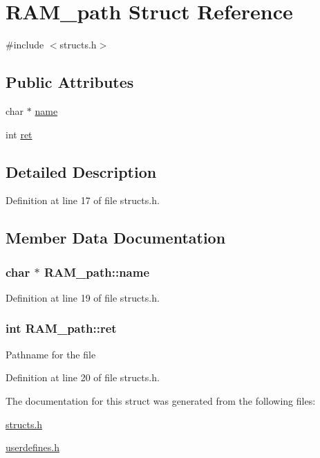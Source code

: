 \hypertarget{struct_r_a_m__path}{\section{R\-A\-M\-\_\-path Struct Reference}
\label{struct_r_a_m__path}
}


{\ttfamily \#include $<$structs.\-h$>$}

\subsection*{Public Attributes}
\begin{DoxyCompactItemize}
\item 
char $\ast$ \hyperlink{struct_r_a_m__path_a9e9b012b9623c1d15aa38835fe047078}{name}
\item 
int \hyperlink{struct_r_a_m__path_a9181c6ce5aa71ef478f8966dde083935}{ret}
\end{DoxyCompactItemize}


\subsection{Detailed Description}


Definition at line 17 of file structs.\-h.



\subsection{Member Data Documentation}
\hypertarget{struct_r_a_m__path_a9e9b012b9623c1d15aa38835fe047078}{
\subsubsection[{name}]{\setlength{\rightskip}{0pt plus 5cm}char $\ast$ R\-A\-M\-\_\-path\-::name}}\label{struct_r_a_m__path_a9e9b012b9623c1d15aa38835fe047078}


Definition at line 19 of file structs.\-h.

\hypertarget{struct_r_a_m__path_a9181c6ce5aa71ef478f8966dde083935}{
\subsubsection[{ret}]{\setlength{\rightskip}{0pt plus 5cm}int R\-A\-M\-\_\-path\-::ret}}\label{struct_r_a_m__path_a9181c6ce5aa71ef478f8966dde083935}
Pathname for the file 

Definition at line 20 of file structs.\-h.



The documentation for this struct was generated from the following files\-:\begin{DoxyCompactItemize}
\item 
\hyperlink{structs_8h}{structs.\-h}\item 
\hyperlink{userdefines_8h}{userdefines.\-h}\end{DoxyCompactItemize}
